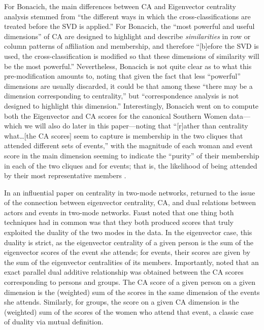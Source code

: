 \documentclass[a4paper,fleqn]{cas-sc}
\begin{document}
For Bonacich, the main differences between CA and Eigenvector centrality analysis stemmed from ``the different ways in which the cross-classifications are treated before the SVD is applied.'' For Bonacich, the ``most powerful and useful dimensions'' of CA are designed to highlight and describe \textit{similarities} in row or column patterns of affiliation and membership, and therefore ``[b]efore the SVD is used, the cross-classification is modified so that these dimensions of similarity will be the most powerful.'' Nevertheless, Bonacich is not quite clear as to what this pre-modification amounts to, noting that given the fact that less ``powerful'' dimensions are usually discarded, it could be that among these ``there may be a dimension corresponding to centrality,'' but ``correspondence analysis is not designed to highlight this dimension.'' Interestingly, Bonacich went on to compute both the Eigenvector and CA scores for the canonical Southern Women data---which we will also do later in this paper---noting that ``[r]ather than centrality what\ldots[the CA scores] seem to capture is membership in the two cliques that attended different sets of events,'' with the magnitude of each woman and event score in the main dimension seeming to indicate the ``purity'' of their membership in each of the two cliques and for events; that is, the likelihood of being attended by their most representative members  \citep[164]{bonacich1991simultaneous}. 

In an influential paper on centrality in two-mode networks, \citet{faust1997centrality} returned to the issue of the connection between eigenvector centrality, CA, and dual relations between actors and events in two-mode networks. Faust noted that one thing both techniques had in common was that they both produced scores that truly exploited the duality of the two modes in the data. In the eigenvector case, this duality is strict, as the eigenvector centrality of a given person is the sum of the eigenvector scores of the event she attends; for events, their scores are given by the sum of the eigenvector centralities of its members. Importantly, \citet{faust1997centrality} noted that an exact parallel dual additive relationship was obtained between the CA scores corresponding to persons and groups. The CA score of a given person on a given dimension is the (weighted) sum of the scores in the same dimension of the events she attends. Similarly, for groups, the score on a given CA dimension is the (weighted) sum of the scores of the women who attend that event, a classic case of duality via mutual definition. %
\end{document}
